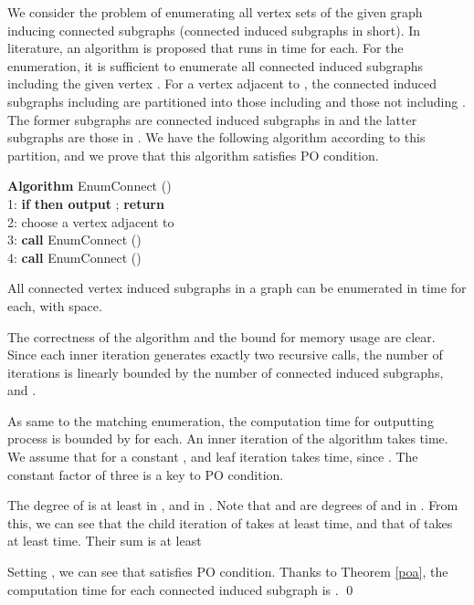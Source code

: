\documentclass{llncs}
\begin{document}
We consider the problem of enumerating all vertex sets of the given graph  inducing connected subgraphs (connected induced subgraphs in short).
In literature, an algorithm is proposed that runs in  time for
 each\cite{AvFk96}.
For the enumeration, it is sufficient to enumerate all connected 
 induced subgraphs including the given vertex .
For a vertex  adjacent to , the connected induced subgraphs
 including  are partitioned into those including  and
 those not including .
The former subgraphs are connected induced subgraphs in 
  and the latter subgraphs are those in .
We have the following algorithm according to this partition, and we 
 prove that this algorithm satisfies PO condition.

\begin{tabbing}
{\bf Algorithm} EnumConnect ()\\
1: {\bf if}  {\bf then output} ; {\bf return}\\
2: choose a vertex  adjacent to \\
3: {\bf call} EnumConnect ()\\
4: {\bf call} EnumConnect ()
\end{tabbing}

\begin{theorem}\label{connect}
All connected vertex induced subgraphs in a graph can be enumerated in 
 time for each, with  space.
\end{theorem}

\proof
The correctness of the algorithm and the bound for memory usage are clear.
Since each inner iteration generates exactly two recursive calls, 
 the number of iterations is linearly bounded by the number of connected
 induced subgraphs, and .

As same to the matching enumeration, the computation time for outputting 
process is bounded by  for each.
An inner iteration  of the algorithm takes  time.
We assume that  for a constant , and 
 leaf iteration takes  time, since .
The constant factor of three is a key to PO condition.

The degree of  is at least  in , and 
  in .
Note that  and  are degrees of  and  in .
From this, we can see that the child iteration of  takes
 at least  time, and that of  takes
 at least  time.
Their sum is at least

\vspace{-1mm}

\vspace{-3mm}

\noindent
Setting , we can see that  satisfies PO condition.
Thanks to Theorem \ref{poa}, the computation time for each connected
 induced subgraph is .
\qed
\end{document}
